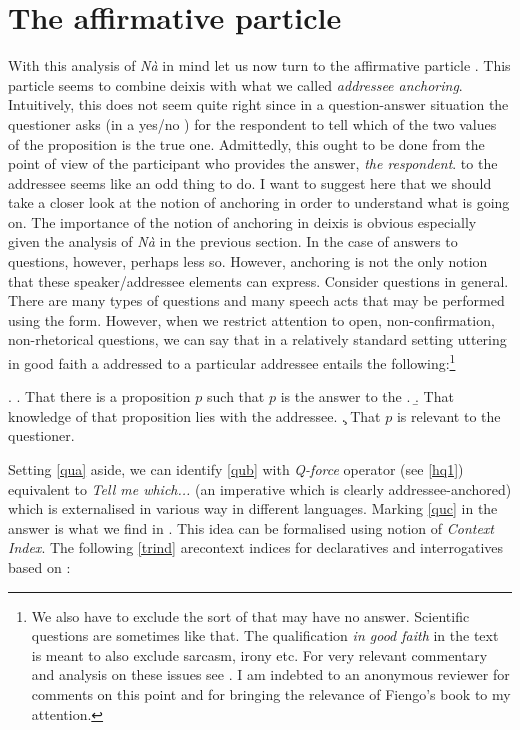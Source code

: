 \documentclass[output=paper]{LSP/langsci}
\begin{document}
\section{The affirmative particle \nai}
\label{sec5}
With this analysis of \textit{N\`{a}} in mind let us now turn to the affirmative particle \nai.  This particle seems to combine deixis with what we called \textit{addressee anchoring}.  Intuitively, this does not seem quite right since in a question-answer situation the questioner asks (in a yes/no ) for the respondent to tell which of the two values of the proposition is the true one.  Admittedly, this ought to be done from the point of view of the participant who provides the answer, \textit{the respondent}.   to the addressee seems like an odd thing to do.  I want to suggest here that we should take a closer look at the notion of anchoring in order to understand what is going on.  The importance of the notion of anchoring in deixis is obvious especially given the analysis of \textit{N\`{a}} in the previous section.  In the case of answers to questions, however, perhaps less so.  However, anchoring is not the only notion that these speaker/addressee elements can express. Consider questions in general.  There are many types of questions and many speech acts that may be performed using the  form.  However, when we restrict attention to open, non-confirmation, non-rhetorical questions, we can say that in a relatively standard setting uttering in good faith a  addressed to a particular addressee entails the following:\footnote{We also have to exclude the sort of  that may have no answer.  Scientific questions are sometimes like that.  The qualification \textit{in good faith} in the text is meant to also exclude sarcasm, irony etc.  For very relevant commentary and analysis on these issues see \citet{fiengo:07}.  I am indebted to an anonymous reviewer for comments on this point and for bringing the relevance of Fiengo's book to my attention.} 

\Lsciex.
\a. That there is a proposition $p$ such that $p$ is the answer to the . \label{qua}
\b. That knowledge of that proposition lies with the addressee. \label{qub} 
\c. That $p$  is relevant to the questioner.  \label{quc}


Setting \ref{qua} aside, we can identify \ref{qub} with  \textit{Q-force} operator (see \ref{hq1}) equivalent to \textit{Tell me which...} (an imperative which is clearly addressee-anchor\-ed) which is externalised in various way in different languages.  Marking \ref{quc} in the answer is what we find in .  This idea can be formalised using  notion of \textit{Context Index}.  The following \ref{trind} are\largerpage context indices for declaratives and interrogatives based on  \citet{truckenbrodt:06}:
\end{document}
